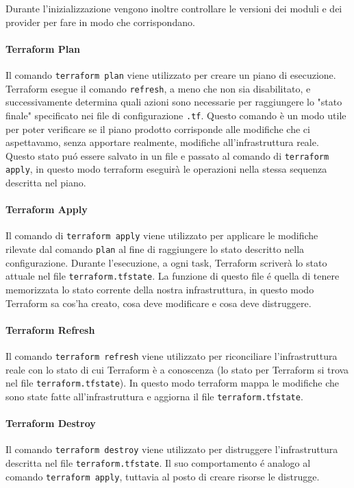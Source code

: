 \documentclass[12pt, a4paper, titlepage]{article}
\begin{document}
Durante l'inizializzazione vengono inoltre controllare le versioni dei moduli e dei provider per fare in modo che corrispondano.

\paragraph{Terraform Plan}
Il comando \texttt{terraform plan} viene utilizzato per creare un piano di esecuzione.
Terraform esegue il comando \texttt{refresh}, a meno che non sia disabilitato, e successivamente determina quali azioni sono necessarie per raggiungere lo "stato finale" specificato nei file di configurazione \texttt{.tf}.
Questo comando è un modo utile per poter verificare se il piano prodotto corrisponde alle modifiche che ci aspettavamo, senza apportare realmente, modifiche all'infrastruttura reale. Questo stato puó essere salvato in un file e passato al comando di \texttt{terraform apply}, in questo modo terraform eseguirà le operazioni nella stessa sequenza descritta nel piano.

\paragraph{Terraform Apply}
Il comando di \texttt{terraform apply} viene utilizzato per applicare le modifiche rilevate dal comando \texttt{plan} al fine di raggiungere lo stato descritto nella configurazione.
Durante l'esecuzione, a ogni task, Terraform scriverà lo stato attuale nel file \texttt{terraform.tfstate}. La funzione di questo file é quella di tenere memorizzata lo stato corrente della nostra infrastruttura, in questo modo Terraform sa cos'ha creato, cosa deve modificare e cosa deve distruggere.

\paragraph{Terraform Refresh}
Il comando \texttt{terraform refresh} viene utilizzato per riconciliare l'infrastruttura reale con lo stato di cui Terraform è a conoscenza (lo stato per Terraform si trova nel file \texttt{terraform.tfstate}).
In questo modo terraform mappa le modifiche che sono state fatte all'infrastruttura e aggiorna il file \texttt{terraform.tfstate}.

\paragraph{Terraform Destroy}
Il comando \texttt{terraform destroy} viene utilizzato per distruggere l'infrastruttura descritta nel file \texttt{terraform.tfstate}. Il suo comportamento é analogo al comando \texttt{terraform apply}, tuttavia al posto di creare risorse le distrugge.
\end{document}
